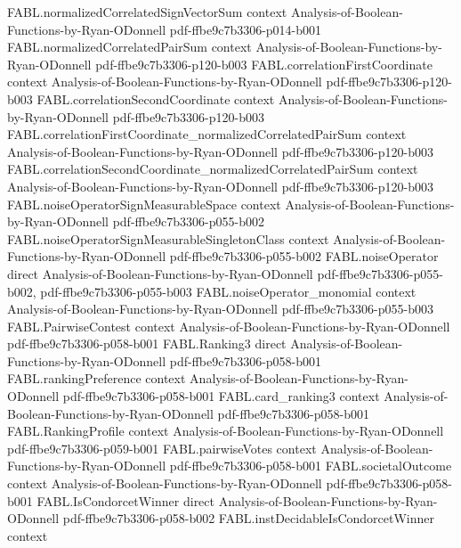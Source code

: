 \begin{theorem}
\proofstep
  {FABL.normalizedCorrelatedSignVectorSum}
  {context}
  {Analysis-of-Boolean-Functions-by-Ryan-ODonnell}
  {pdf-ffbe9c7b3306-p014-b001}
\proofstep
  {FABL.normalizedCorrelatedPairSum}
  {context}
  {Analysis-of-Boolean-Functions-by-Ryan-ODonnell}
  {pdf-ffbe9c7b3306-p120-b003}
\proofstep
  {FABL.correlationFirstCoordinate}
  {context}
  {Analysis-of-Boolean-Functions-by-Ryan-ODonnell}
  {pdf-ffbe9c7b3306-p120-b003}
\proofstep
  {FABL.correlationSecondCoordinate}
  {context}
  {Analysis-of-Boolean-Functions-by-Ryan-ODonnell}
  {pdf-ffbe9c7b3306-p120-b003}
\proofstep
  {FABL.correlationFirstCoordinate_normalizedCorrelatedPairSum}
  {context}
  {Analysis-of-Boolean-Functions-by-Ryan-ODonnell}
  {pdf-ffbe9c7b3306-p120-b003}
\proofstep
  {FABL.correlationSecondCoordinate_normalizedCorrelatedPairSum}
  {context}
  {Analysis-of-Boolean-Functions-by-Ryan-ODonnell}
  {pdf-ffbe9c7b3306-p120-b003}
\proofstep
  {FABL.noiseOperatorSignMeasurableSpace}
  {context}
  {Analysis-of-Boolean-Functions-by-Ryan-ODonnell}
  {pdf-ffbe9c7b3306-p055-b002}
\proofstep
  {FABL.noiseOperatorSignMeasurableSingletonClass}
  {context}
  {Analysis-of-Boolean-Functions-by-Ryan-ODonnell}
  {pdf-ffbe9c7b3306-p055-b002}
\proofstep
  {FABL.noiseOperator}
  {direct}
  {Analysis-of-Boolean-Functions-by-Ryan-ODonnell}
  {pdf-ffbe9c7b3306-p055-b002,
    pdf-ffbe9c7b3306-p055-b003}
\proofstep
  {FABL.noiseOperator_monomial}
  {context}
  {Analysis-of-Boolean-Functions-by-Ryan-ODonnell}
  {pdf-ffbe9c7b3306-p055-b003}
\proofstep
  {FABL.PairwiseContest}
  {context}
  {Analysis-of-Boolean-Functions-by-Ryan-ODonnell}
  {pdf-ffbe9c7b3306-p058-b001}
\proofstep
  {FABL.Ranking3}
  {direct}
  {Analysis-of-Boolean-Functions-by-Ryan-ODonnell}
  {pdf-ffbe9c7b3306-p058-b001}
\proofstep
  {FABL.rankingPreference}
  {context}
  {Analysis-of-Boolean-Functions-by-Ryan-ODonnell}
  {pdf-ffbe9c7b3306-p058-b001}
\proofstep
  {FABL.card_ranking3}
  {context}
  {Analysis-of-Boolean-Functions-by-Ryan-ODonnell}
  {pdf-ffbe9c7b3306-p058-b001}
\proofstep
  {FABL.RankingProfile}
  {context}
  {Analysis-of-Boolean-Functions-by-Ryan-ODonnell}
  {pdf-ffbe9c7b3306-p059-b001}
\proofstep
  {FABL.pairwiseVotes}
  {context}
  {Analysis-of-Boolean-Functions-by-Ryan-ODonnell}
  {pdf-ffbe9c7b3306-p058-b001}
\proofstep
  {FABL.societalOutcome}
  {context}
  {Analysis-of-Boolean-Functions-by-Ryan-ODonnell}
  {pdf-ffbe9c7b3306-p058-b001}
\proofstep
  {FABL.IsCondorcetWinner}
  {direct}
  {Analysis-of-Boolean-Functions-by-Ryan-ODonnell}
  {pdf-ffbe9c7b3306-p058-b002}
\proofstep
  {FABL.instDecidableIsCondorcetWinner}
  {context}

\end{theorem}
